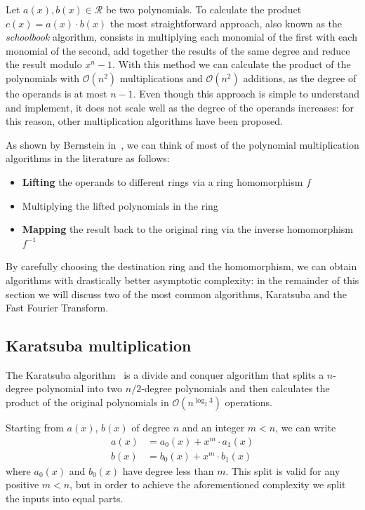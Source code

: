 Let $a(x), b(x) \in \mathcal{R}$ be two polynomials. To calculate the product $c(x) = a(x)\cdot b(x)$ the most straightforward
approach, also known as the \emph{schoolbook} algorithm, consists in multiplying each monomial of the first with each monomial of the second,
add together the results of the same degree and reduce the result modulo $x^n-1$. With this method we can calculate the product of the polynomials with $\mathcal{O}(n^2)$ multiplications
and $\mathcal{O}(n^2)$ additions, as the degree of the operands is at most $n-1$. Even though this approach is simple to understand and implement, 
it does not scale well as the degree of the operands increases: for this reason, other multiplication algorithms have been proposed.

As shown by Bernstein in~\cite{bernstein2001multidigit}, we can think of most of the polynomial multiplication algorithms in the literature
as follows:
\begin{itemize}
    \item \textbf{Lifting} the operands to different rings via a ring homomorphism $f$
    \item Multiplying the lifted polynomials in the ring
    \item \textbf{Mapping} the result back to the original ring via the inverse homomorphism $f^{-1}$
\end{itemize} 
By carefully choosing the destination ring and the homomorphism, we can obtain algorithms with drastically better asymptotic complexity:
in the remainder of this section we will discuss two of the most common algorithms, Karatsuba and the Fast Fourier Transform. 

\subsection{Karatsuba multiplication}
The Karatsuba algorithm~\cite{karatsuba1962multiplication} is a divide and conquer algorithm that splits a $n$-degree polynomial into 
two $n/2$-degree polynomials and then calculates the product of the original polynomials in $\mathcal{O}(n^{\log_2 3})$ operations.

Starting from $a(x)$, $b(x)$ of degree $n$ and an integer $m < n$, we can write
\begin{equation*}
\begin{aligned}
    a(x) &= a_0(x) + x^m\cdot a_1(x) \\
    b(x) &= b_0(x) + x^m\cdot b_1(x)
\end{aligned}
\end{equation*}
where $a_0(x)$ and $b_0(x)$ have degree less than $m$. This split is valid for any positive $m < n$, but in order to achieve the
aforementioned complexity we split the inputs into equal parts.

